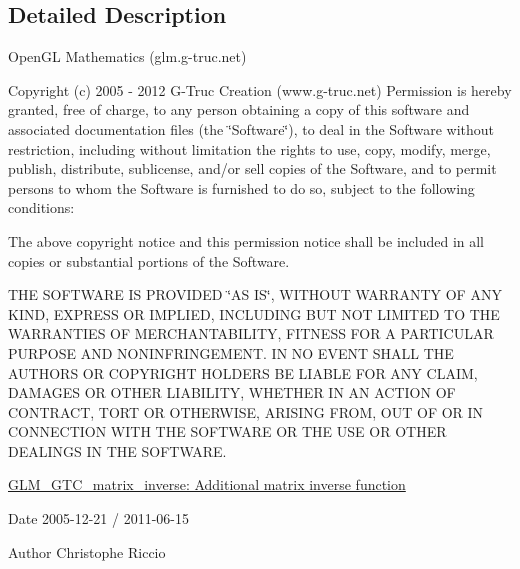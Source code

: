 \subsection{\-Detailed \-Description}
\-Open\-G\-L \-Mathematics (glm.\-g-\/truc.\-net)

\-Copyright (c) 2005 -\/ 2012 \-G-\/\-Truc \-Creation (www.\-g-\/truc.\-net) \-Permission is hereby granted, free of charge, to any person obtaining a copy of this software and associated documentation files (the \char`\"{}\-Software\char`\"{}), to deal in the \-Software without restriction, including without limitation the rights to use, copy, modify, merge, publish, distribute, sublicense, and/or sell copies of the \-Software, and to permit persons to whom the \-Software is furnished to do so, subject to the following conditions\-:

\-The above copyright notice and this permission notice shall be included in all copies or substantial portions of the \-Software.

\-T\-H\-E \-S\-O\-F\-T\-W\-A\-R\-E \-I\-S \-P\-R\-O\-V\-I\-D\-E\-D \char`\"{}\-A\-S I\-S\char`\"{}, \-W\-I\-T\-H\-O\-U\-T \-W\-A\-R\-R\-A\-N\-T\-Y \-O\-F \-A\-N\-Y \-K\-I\-N\-D, \-E\-X\-P\-R\-E\-S\-S \-O\-R \-I\-M\-P\-L\-I\-E\-D, \-I\-N\-C\-L\-U\-D\-I\-N\-G \-B\-U\-T \-N\-O\-T \-L\-I\-M\-I\-T\-E\-D \-T\-O \-T\-H\-E \-W\-A\-R\-R\-A\-N\-T\-I\-E\-S \-O\-F \-M\-E\-R\-C\-H\-A\-N\-T\-A\-B\-I\-L\-I\-T\-Y, \-F\-I\-T\-N\-E\-S\-S \-F\-O\-R \-A \-P\-A\-R\-T\-I\-C\-U\-L\-A\-R \-P\-U\-R\-P\-O\-S\-E \-A\-N\-D \-N\-O\-N\-I\-N\-F\-R\-I\-N\-G\-E\-M\-E\-N\-T. \-I\-N \-N\-O \-E\-V\-E\-N\-T \-S\-H\-A\-L\-L \-T\-H\-E \-A\-U\-T\-H\-O\-R\-S \-O\-R \-C\-O\-P\-Y\-R\-I\-G\-H\-T \-H\-O\-L\-D\-E\-R\-S \-B\-E \-L\-I\-A\-B\-L\-E \-F\-O\-R \-A\-N\-Y \-C\-L\-A\-I\-M, \-D\-A\-M\-A\-G\-E\-S \-O\-R \-O\-T\-H\-E\-R \-L\-I\-A\-B\-I\-L\-I\-T\-Y, \-W\-H\-E\-T\-H\-E\-R \-I\-N \-A\-N \-A\-C\-T\-I\-O\-N \-O\-F \-C\-O\-N\-T\-R\-A\-C\-T, \-T\-O\-R\-T \-O\-R \-O\-T\-H\-E\-R\-W\-I\-S\-E, \-A\-R\-I\-S\-I\-N\-G \-F\-R\-O\-M, \-O\-U\-T \-O\-F \-O\-R \-I\-N \-C\-O\-N\-N\-E\-C\-T\-I\-O\-N \-W\-I\-T\-H \-T\-H\-E \-S\-O\-F\-T\-W\-A\-R\-E \-O\-R \-T\-H\-E \-U\-S\-E \-O\-R \-O\-T\-H\-E\-R \-D\-E\-A\-L\-I\-N\-G\-S \-I\-N \-T\-H\-E \-S\-O\-F\-T\-W\-A\-R\-E.

\hyperlink{group__gtc__matrix__inverse}{\-G\-L\-M\-\_\-\-G\-T\-C\-\_\-matrix\-\_\-inverse\-: \-Additional matrix inverse function}

\begin{DoxyDate}{\-Date}
2005-\/12-\/21 / 2011-\/06-\/15 
\end{DoxyDate}
\begin{DoxyAuthor}{\-Author}
\-Christophe \-Riccio 
\end{DoxyAuthor}
